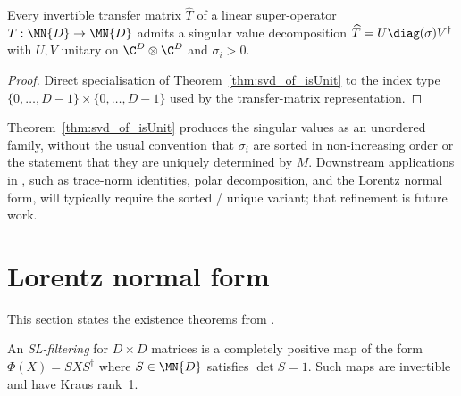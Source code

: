 \begin{theorem}
    \label{thm:transferMatrix_svd_of_isUnit}
    \leanok
    Every invertible transfer matrix $\widehat{T}$ of a linear super-operator
    $T : \MN{D} \to \MN{D}$ admits a singular value decomposition
    $\widehat{T} = U \diag(\sigma) V^{\dagger}$ with $U, V$
    unitary on $\C^{D} \otimes \C^{D}$ and $\sigma_i > 0$.
\end{theorem}

\begin{proof}\leanok
    Direct specialisation of Theorem~\ref{thm:svd_of_isUnit} to the index type
    $\{0,\ldots,D-1\} \times \{0,\ldots,D-1\}$ used by the transfer-matrix
    representation.
\end{proof}

\begin{remark}
    Theorem~\ref{thm:svd_of_isUnit} produces the singular values as an
    unordered family, without the usual convention that $\sigma_{i}$ are sorted
    in non-increasing order or the statement that they are uniquely determined
    by $M$. Downstream applications in \cite[Section~2.3]{Wolf2012Quantum},
    such as trace-norm identities, polar decomposition, and the Lorentz normal
    form, will typically require the sorted / unique variant; that refinement is
    future work.
\end{remark}

\section{Lorentz normal form}
\label{sec:lorentz_normal_form}

This section states the existence theorems from
\cite[Section~2.3]{Wolf2012Quantum}.

\begin{definition}\label{def:sl_filtering}
    An \emph{SL-filtering} for $D \times D$ matrices is a completely
    positive map of the form $\Phi(X) = S X S^{\dagger}$ where
    $S \in \MN{D}$ satisfies $\det S = 1$. Such maps are
    invertible and have Kraus rank~1.
\end{definition}

